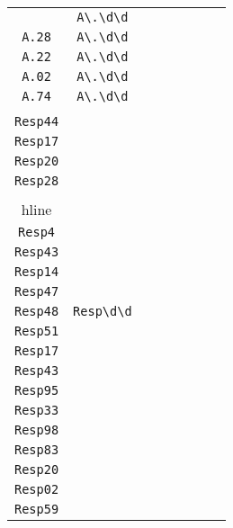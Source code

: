 \begin{longtable}{cccccccc}
\begin{tabular}{ll}
    \verb|A.21| & \verb|A\.\d\d|\\
\verb|A.28| & \verb|A\.\d\d|\\
\verb|A.22| & \verb|A\.\d\d|\\
\verb|A.02| & \verb|A\.\d\d|\\
\verb|A.74| & \verb|A\.\d\d|
\end{tabular}
\\\midrule 
\begin{tabular}{l}
    \verb|Resp19|\\
\verb|Resp44|\\
\verb|Resp17|\\
\verb|Resp20|\\
\verb|Resp28|\\
\\hline\\
\verb|Resp4|\\
\verb|Resp43|\\
\verb|Resp14|\\
\verb|Resp47|\\
\verb|Resp48|
\end{tabular}

&
\verb|Resp\d\d|
&

\begin{tabular}{l}
    \verb|Resp\d\d|\\
\verb|Resp51|\\
\verb|Resp17|\\
\verb|Resp43|\\
\verb|Resp95|\\
\verb|Resp33|
\end{tabular}

&

\begin{tabular}{l}
    \verb|Resp\d\d|\\
\verb|Resp98|\\
\verb|Resp83|\\
\verb|Resp20|\\
\verb|Resp02|\\
\verb|Resp59|
\end{tabular}

&


\end{longtable}
